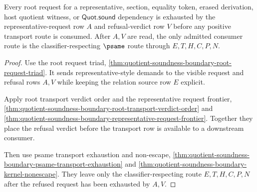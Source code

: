 \begin{theorem}
\label{thm:quotient-soundness-boundary-root-representative-refusal-totality}
Every root request for a representative, section, equality token, erased derivation, host quotient witness, or $\mathsf{Quot.sound}$ dependency is exhausted by the representative-request row $A$ and refusal-verdict row $V$ before any positive transport route is consumed. After $A,V$ are read, the only admitted consumer route is the classifier-respecting $\psame$ route through $E,T,H,C,P,N$.
\end{theorem}
\begin{proof}
Use the root request triad, \autoref{thm:quotient-soundness-boundary-root-request-triad}. It sends representative-style demands to the visible request and refusal rows $A,V$ while keeping the relation source row $E$ explicit.

Apply root transport verdict order and the representative request frontier, \autoref{thm:quotient-soundness-boundary-root-transport-verdict-order} and \autoref{thm:quotient-soundness-boundary-representative-request-frontier}. Together they place the refusal verdict before the transport row is available to a downstream consumer.

Then use psame transport exhaustion and non-escape, \autoref{thm:quotient-soundness-boundary-psame-transport-exhaustion} and \autoref{thm:quotient-soundness-boundary-kernel-nonescape}. They leave only the classifier-respecting route $E,T,H,C,P,N$ after the refused request has been exhausted by $A,V$.
\end{proof}

